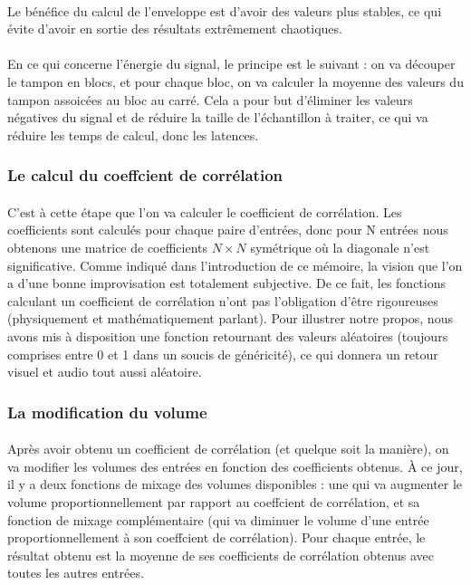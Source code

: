 \paragraph{}
Le bénéfice du calcul de l'enveloppe est d'avoir des valeurs plus stables, ce qui évite d'avoir en sortie des résultats extrêmement chaotiques.
\paragraph{}
En ce qui concerne l'énergie du signal, le principe est le suivant : on va découper le tampon en blocs, et pour chaque bloc, on va calculer la moyenne des valeurs du tampon assoicées au bloc au carré. Cela a pour but d'éliminer les valeurs négatives du signal et de réduire la taille de l'échantillon à traiter,
ce qui va réduire les temps de calcul, donc les latences.
\subsubsection{Le calcul du coeffcient de corrélation}
\paragraph{}
C'est à cette étape que l'on va calculer le coefficient de corrélation. Les coefficients sont calculés pour chaque paire d'entrées, donc pour N entrées nous obtenons une matrice de coefficients $N \times N$ symétrique où la diagonale n'est significative. Comme indiqué dans l'introduction de ce mémoire, la vision que l'on a d'une bonne improvisation est totalement subjective. De ce fait, les fonctions calculant un coefficient de corrélation n'ont pas l'obligation d'être rigoureuses (physiquement et mathématiquement parlant). Pour illustrer notre propos, nous avons mis à disposition une fonction retournant des valeurs aléatoires (toujours comprises entre 0 et 1 dans un soucis de généricité), ce qui donnera un retour visuel et audio tout aussi aléatoire.
\subsubsection{La modification du volume}
\paragraph{}
Après avoir obtenu un coefficient de corrélation (et quelque soit la manière), on va modifier les volumes des entrées en fonction des coefficients obtenus. À ce jour, il y a deux fonctions de mixage des volumes disponibles : une qui va augmenter le volume proportionnellement par rapport au  coeffcient de corrélation, et sa fonction de mixage complémentaire (qui va diminuer le volume d'une entrée proportionnellement à son coeffcient de corrélation). Pour chaque entrée, le résultat obtenu est la moyenne de ses coefficients de corrélation obtenus avec toutes les autres entrées.
